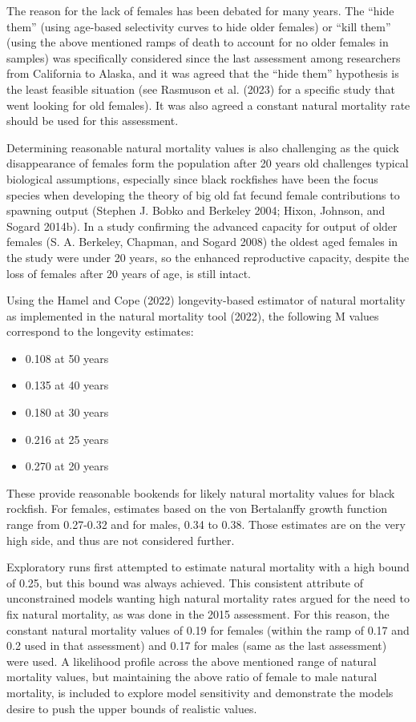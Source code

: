 \documentclass[11pt,
  english,
  letterpaper,
]{article}
\providecommand{\tightlist}{%
  \setlength{\itemsep}{0pt}\setlength{\parskip}{0pt}}
\providecommand{\tightlist}{%
  \setlength{\itemsep}{0pt}\setlength{\parskip}{0pt}}
\begin{document}
The reason for the lack of females has been debated for many years. The ``hide them'' (using age-based selectivity curves to hide older females) or ``kill them'' (using the above mentioned ramps of death to account for no older females in samples) was specifically considered since the last assessment among researchers from California to Alaska, and it was agreed that the ``hide them'' hypothesis is the least feasible situation (see Rasmuson et al. (2023) for a specific study that went looking for old females). It was also agreed a constant natural mortality rate should be used for this assessment.

Determining reasonable natural mortality values is also challenging as the quick disappearance of females form the population after 20 years old challenges typical biological assumptions, especially since black rockfishes have been the focus species when developing the theory of big old fat fecund female contributions to spawning output (Stephen J. Bobko and Berkeley 2004; Hixon, Johnson, and Sogard 2014b). In a study confirming the advanced capacity for output of older females (S. A. Berkeley, Chapman, and Sogard 2008) the oldest aged females in the study were under 20 years, so the enhanced reproductive capacity, despite the loss of females after 20 years of age, is still intact.

Using the Hamel and Cope (2022) longevity-based estimator of natural mortality as implemented in the natural mortality tool (2022), the following M values correspond to the longevity estimates:

\begin{itemize}
\tightlist
\item
  0.108 at 50 years
\item
  0.135 at 40 years
\item
  0.180 at 30 years
\item
  0.216 at 25 years
\item
  0.270 at 20 years
\end{itemize}

These provide reasonable bookends for likely natural mortality values for black rockfish. For females, estimates based on the von Bertalanffy growth function range from 0.27-0.32 and for males, 0.34 to 0.38. Those estimates are on the very high side, and thus are not considered further.

Exploratory runs first attempted to estimate natural mortality with a high bound of 0.25, but this bound was always achieved. This consistent attribute of unconstrained models wanting high natural mortality rates argued for the need to fix natural mortality, as was done in the 2015 assessment. For this reason, the constant natural mortality values of 0.19 for females (within the ramp of 0.17 and 0.2 used in that assessment) and 0.17 for males (same as the last assessment) were used. A likelihood profile across the above mentioned range of natural mortality values, but maintaining the above ratio of female to male natural mortality, is included to explore model sensitivity and demonstrate the models desire to push the upper bounds of realistic values.
\end{document}
